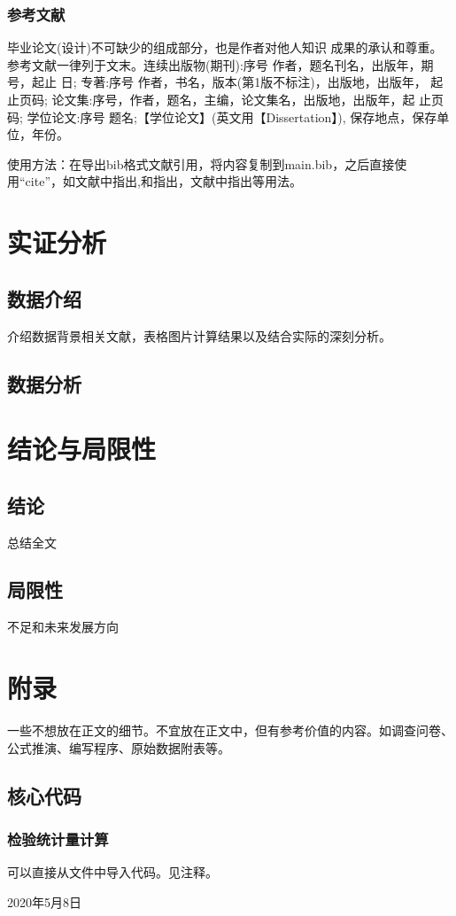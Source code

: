 \documentclass{SUFEThesis}
\begin{document}
\subsubsection{参考文献}
毕业论文(设计)不可缺少的组成部分，也是作者对他人知识
成果的承认和尊重。参考文献一律列于文末。连续出版物(期刊):序号 作者，题名刊名，出版年，期号，起止 日;
专著:序号 作者，书名，版本(第1版不标注)，出版地，出版年， 起止页码; 论文集:序号，作者，题名，主编，论文集名，出版地，出版年，起 止页码;
学位论文:序号 题名;【学位论文】(英文用【Dissertation】),
保存地点，保存单位，年份。\par
使用方法：在导出bib格式文献引用，将内容复制到main.bib，之后直接使用“cite”，如文献中指出\cite{guegan2005can},\citet{guegan2005can}和\citet{dahlhaus1997}指出，文献中指出\cite{guegan2005can,dahlhaus1997}等用法。


\section{实证分析}
\subsection{数据介绍}
介绍数据背景相关文献，表格图片计算结果以及结合实际的深刻分析。


\subsection{数据分析}


\section{结论与局限性}
\subsection{结论}
总结全文
\subsection{局限性}
不足和未来发展方向

\newpage


 
\section{附录}
一些不想放在正文的细节。不宜放在正文中，但有参考价值的内容。如调查问卷、 公式推演、编写程序、原始数据附表等。
\subsection{核心代码}
\subsubsection{检验统计量计算}
可以直接从文件中导入代码。见注释。
% 


\statement %
\hfill 2020年5月8日 %
\end{document}
